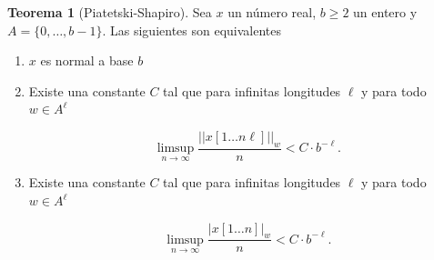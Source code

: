 \documentclass{report}
\theoremstyle{definition} %
\newtheorem{theorem}{Teorema}[chapter]
\begin{document}
\begin{theorem}[Piatetski-Shapiro]\label{teo:piatetski-shapiro}
    Sea $x$ un número real, $b \geq 2$ un entero y $A = \{0, \dots, b - 1\}$.
    Las siguientes son equivalentes
    \begin{enumerate}
        \item $x$ es normal a base $b$
        \item Existe una constante $C$ tal que para infinitas longitudes $\ell$ y
        para todo $w \in A^\ell$

        $$
            \limsup_{n\to\infty}
            \frac{||x[1\dots n\ell]||_w}{n} < C \cdot b^{-\ell}.
        $$ 

        \item Existe una constante $C$ tal que para infinitas longitudes $\ell$ y
        para todo $w \in A^\ell$

        $$
            \limsup_{n\to\infty}
            \frac{|x[1\dots n]|_w}{n} < C \cdot b^{-\ell}.
        $$
    \end{enumerate}
\end{theorem}
\end{document}
